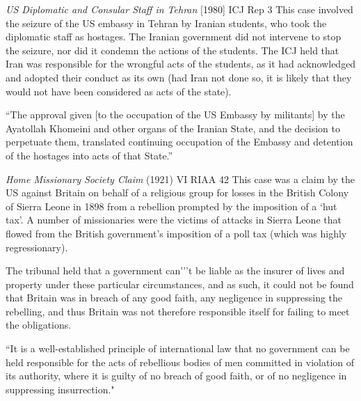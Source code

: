 \begin{casedetails}{\textit{US Diplomatic and Consular Staff in Tehran} [1980] ICJ Rep 3}
    \flushleft
    This case involved the seizure of the US embassy in Tehran by Iranian students, who took the diplomatic staff as hostages. The Iranian government did not intervene to stop the seizure, nor did it condemn the actions of the students. The ICJ held that Iran was responsible for the wrongful acts of the students, as it had acknowledged and adopted their conduct as its own (had Iran not done so, it is likely that they would not have been considered as acts of the state).
    
    \vspace{\baselineskip}

    ``The approval given [to the occupation of the US Embassy by militants] by the Ayatollah Khomeini and other organs of the Iranian State, and the decision to perpetuate them, translated continuing occupation of the Embassy and detention of the hostages into acts of that State.''
\end{casedetails}

\begin{casedetails}{\textit{Home Missionary Society Claim} (1921) VI RIAA 42}
    \flushleft
    This case was a claim by the US against Britain on behalf of a religious group for losses in the British Colony of Sierra Leone in 1898 from a rebellion prompted by the imposition of a `hut tax'. A number of missionaries were the victims of attacks in Sierra Leone that flowed from the British government's imposition of a poll tax (which was highly regressionary).

    \vspace{\baselineskip}

    The tribunal held that a government can'’'t be liable as the insurer of lives and property under these particular circumstances, and as such, it could not be found that Britain was in breach of any good faith, any negligence in suppressing the rebelling, and thus Britain was not therefore responsible itself for failing to meet the obligations.

    \vspace{\baselineskip}

    ``It is a well-established principle of international law that no government can be held responsible for the acts of rebellious bodies of men committed in violation of its authority, where it is guilty of no breach of good faith, or of no negligence in suppressing insurrection."

\end{casedetails}


